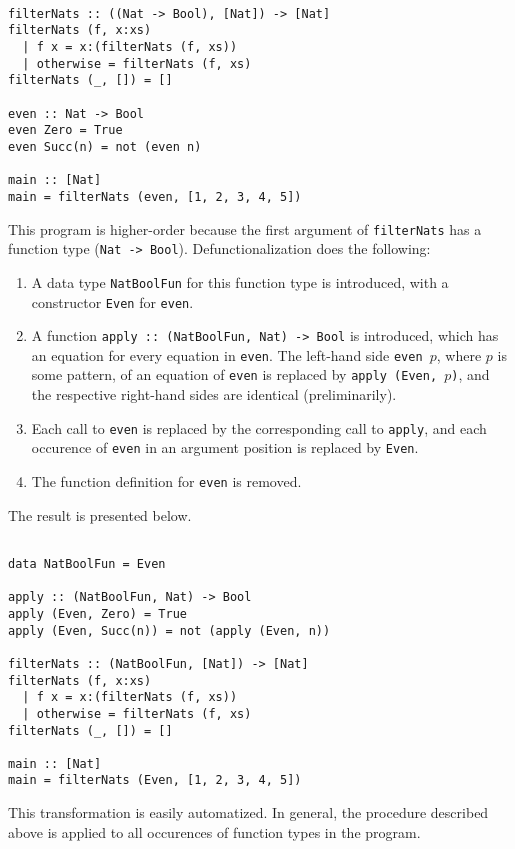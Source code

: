 \begin{lstlisting}

filterNats :: ((Nat -> Bool), [Nat]) -> [Nat]
filterNats (f, x:xs)
  | f x = x:(filterNats (f, xs))
  | otherwise = filterNats (f, xs)
filterNats (_, []) = []

even :: Nat -> Bool
even Zero = True
even Succ(n) = not (even n)

main :: [Nat]
main = filterNats (even, [1, 2, 3, 4, 5])

\end{lstlisting}

This program is higher-order because the first argument of \texttt{filterNats} has a function type (\texttt{Nat -> Bool}). Defunctionalization does the following:
\begin{enumerate}
\item  A data type \texttt{NatBoolFun} for this function type is introduced, with a constructor \texttt{Even} for \texttt{even}.
\item A function \texttt{apply :: (NatBoolFun, Nat) -> Bool} is introduced, which has an equation for every equation in \texttt{even}. The left-hand side \texttt{even $p$}, where $p$ is some pattern, of an equation of \texttt{even} is replaced by \texttt{apply (Even, $p$)}, and the respective right-hand sides are identical (preliminarily).
\item Each call to \texttt{even} is replaced by the corresponding call to \texttt{apply}, and each occurence of \texttt{even} in an argument position is replaced by \texttt{Even}.
\item The function definition for \texttt{even} is removed.
\end{enumerate}
The result is presented below.

\begin{lstlisting}

data NatBoolFun = Even

apply :: (NatBoolFun, Nat) -> Bool
apply (Even, Zero) = True
apply (Even, Succ(n)) = not (apply (Even, n))

filterNats :: (NatBoolFun, [Nat]) -> [Nat]
filterNats (f, x:xs)
  | f x = x:(filterNats (f, xs))
  | otherwise = filterNats (f, xs)
filterNats (_, []) = []

main :: [Nat]
main = filterNats (Even, [1, 2, 3, 4, 5])

\end{lstlisting}

This transformation is easily automatized. In general, the procedure described above is applied to all occurences of function types in the program.

